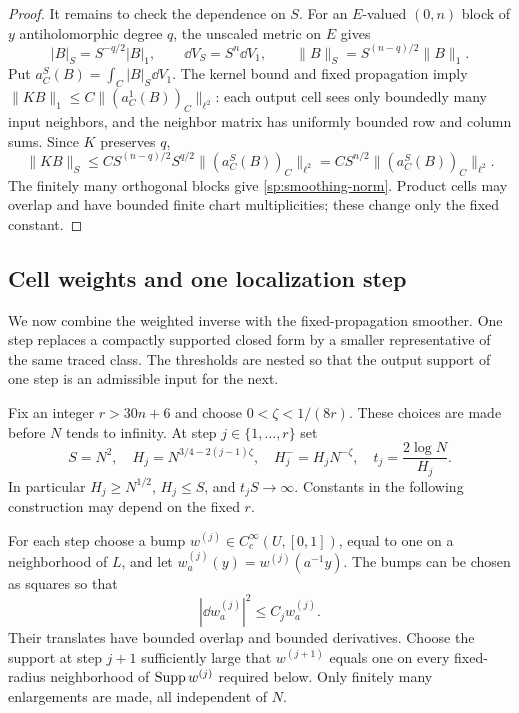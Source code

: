 \begin{proof}
It remains to check the dependence on $S$.  For an $E$-valued $(0,n)$
block of $y$ antiholomorphic degree $q$, the unscaled metric on $E$ gives
\begin{equation}\label{sp:scaling-block}
 |B|_S=S^{-q/2}|B|_1,\qquad
 \dd V_S=S^n\dd V_1,\qquad
 \|B\|_S=S^{(n-q)/2}\|B\|_1.
\end{equation}
Put $a_C^S(B)=\int_C|B|_S\dd V_1$.
The kernel bound and fixed propagation imply
$\|KB\|_1\le C\|(a_C^1(B))_C\|_{\ell^2}$: each output cell sees
only boundedly many input neighbors, and the neighbor matrix has
uniformly bounded row and column sums.  Since $K$ preserves $q$,
\[
 \|KB\|_S
 \le C S^{(n-q)/2}S^{q/2}
             \|(a_C^S(B))_C\|_{\ell^2}
 = C S^{n/2}\|(a_C^S(B))_C\|_{\ell^2}.
\]
The finitely many orthogonal blocks give
\eqref{sp:smoothing-norm}.  Product cells may overlap and have bounded
finite chart multiplicities; these change only the fixed constant.
\end{proof}

\subsection{Cell weights and one localization step}
\label{sp:localization}

We now combine the weighted inverse with the fixed-propagation
smoother. One step replaces a compactly supported closed form by a
smaller representative of the same traced class. The thresholds are
nested so that the output support of one step is an admissible input
for the next.

Fix an integer $r>30n+6$ and choose $0<\zeta<1/(8r)$.  These choices
are made before $N$ tends to infinity.  At step $j\in\{1,\ldots,r\}$ set
\begin{equation}\label{sp:thresholds}
 S=N^2,\quad H_j=N^{3/4-2(j-1)\zeta},\quad
 H_j^-=H_jN^{-\zeta},\quad t_j=\frac{2\log N}{H_j}.
\end{equation}
In particular $H_j\ge N^{1/2}$, $H_j\le S$, and $t_jS\to\infty$.
Constants in the following construction may depend on the fixed $r$.

For each step choose a bump $w^{(j)}\in C_c^\infty(U,[0,1])$, equal
to one on a neighborhood of $L$, and let
$w_a^{(j)}(y)=w^{(j)}(a^{-1}y)$.  The bumps can be chosen as squares so
that
\[
 |\dd w_a^{(j)}|^2\le C_jw_a^{(j)}.
\]
Their translates have bounded overlap and bounded derivatives.  Choose
the support at step $j+1$ sufficiently large that $w^{(j+1)}$ equals
one on every fixed-radius neighborhood of $\operatorname{Supp} w^{(j)}$ required
below.  Only finitely many enlargements are made, all independent of
$N$.

